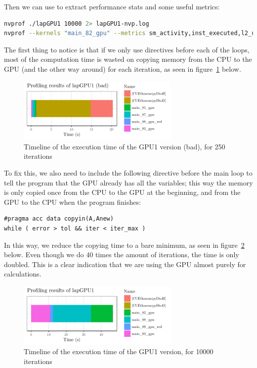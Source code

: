 Then we can use  to extract performance stats and some useful metrics:
\begin{lstlisting}[language=bash]
nvprof ./lapGPU1 10000 2> lapGPU1-nvp.log
nvprof --kernels "main_82_gpu" --metrics sm_activity,inst_executed,l2_utilization, dram_utilization,dram_read_throughput,dram_write_throughput,ipc ./lapGPU1 100 2> lapGPU1-metrics.log
\end{lstlisting}

The first thing to notice is that if we only use  directives before each of the loops, most of the computation time is wasted on copying memory from the CPU to the GPU (and the other way around) for each iteration, as seen in figure~\ref{fig:timeline-gpu1b} below.
\begin{figure}[H]
	\centering
	\includegraphics[width=0.7\textwidth]{images/timeline-gpu1b}
	\caption{Timeline of the execution time of the GPU1 version (bad), for 250 iterations}
	\label{fig:timeline-gpu1b}
\end{figure}

To fix this, we also need to include the following  directive before the main  loop to tell the program that the GPU already has all the variables; this way the memory is only copied once from the CPU to the GPU at the beginning, and from the GPU to the CPU when the program finishes:
\begin{lstlisting}[firstnumber=77]
#pragma acc data copyin(A,Anew)
while ( error > tol && iter < iter_max )
\end{lstlisting}

In this way, we reduce the copying time to a bare minimum, as seen in figure~\ref{fig:timeline-gpu1} below. Even though we do 40 times the amount of iterations, the time is only doubled. This is a clear indication that we are using the GPU almost purely for calculations.
\begin{figure}[H]
	\centering
	\includegraphics[width=0.7\textwidth]{images/timeline-gpu1}
	\caption{Timeline of the execution time of the GPU1 version, for \num{10000} iterations}
	\label{fig:timeline-gpu1}
\end{figure}

